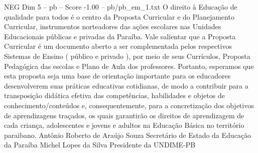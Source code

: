 \begin{textsample}{NEG Dim 5 – pb – Score -1.00 – pb/pb\_em\_1.txt}
O direito à Educação de qualidade para todos é o centro da Proposta Curricular e do Planejamento Curricular, instrumentos norteadores das ações escolares nas Unidades Educacionais públicas e privadas da Paraíba.
Vale salientar que a Proposta Curricular é um documento aberto a ser complementada pelos respectivos Sistemas de Ensino ( público e privado ), por meio de seus Currículos, Proposta Pedagógica das escolas e Plano de Aula dos professores.
Portanto, esperamos que esta proposta seja uma base de orientação importante para os educadores desenvolverem suas práticas educativas cotidianas, de modo a contribuir para a transposição didática efetiva das competências, habilidades e objetos de conhecimento/conteúdos e, consequentemente, para a concretização dos objetivos de aprendizagens traçados, os quais garantirão os direitos de aprendizagem de cada criança, adolescentes e jovens e adultos na Educação Básica no território paraibano.
Antônio Roberto de Araújo Souza Secretário de Estado da Educação da Paraíba Michel Lopes da Silva Presidente da UNDIME-PB

\end{textsample}
